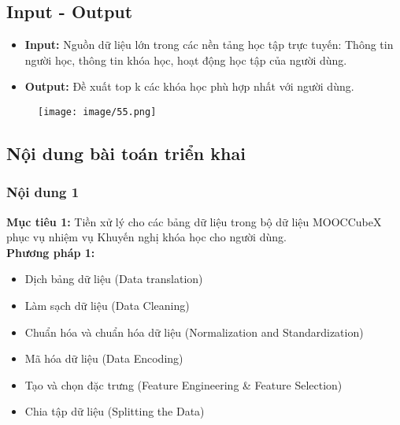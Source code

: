 \subsection{Input - Output}
\begin{itemize}
    \item \textbf{Input:} Nguồn dữ liệu lớn trong các nền tảng học tập trực tuyến: Thông tin người học, thông tin khóa học, hoạt động học tập của người dùng.
    \item \textbf{Output:} Đề xuất top k các khóa học phù hợp nhất với người dùng.
\end{itemize}
\begin{figure}[h]
    \centering
    \texttt{[image: image/55.png]}
\end{figure}
\subsection{Nội dung bài toán triển khai}
\subsubsection{Nội dung 1}
\textbf{Mục tiêu 1:} Tiền xử lý cho các bảng dữ liệu trong bộ dữ liệu MOOCCubeX phục vụ nhiệm vụ Khuyến nghị khóa học cho người dùng.\\
\textbf{Phương pháp 1:}
\begin{itemize}
    \item Dịch bảng dữ liệu (Data translation)
    \item Làm sạch dữ liệu (Data Cleaning)
    \item Chuẩn hóa và chuẩn hóa dữ liệu (Normalization and Standardization)
    \item Mã hóa dữ liệu (Data Encoding)
    \item Tạo và chọn đặc trưng (Feature Engineering \& Feature Selection)
    \item Chia tập dữ liệu (Splitting the Data)
\end{itemize}
